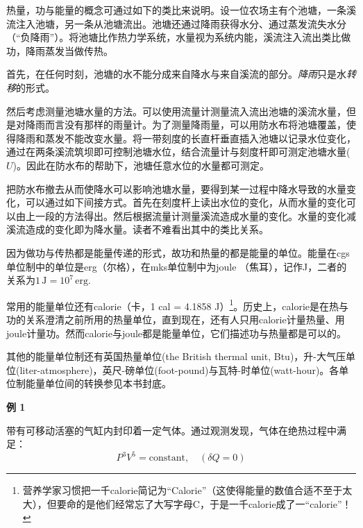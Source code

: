 热量，功与能量的概念可通过如下的类比来说明。设一位农场主有个池塘，一条溪流注入池塘，另一条从池塘流出。池塘还通过降雨获得水分、通过蒸发流失水分（“负降雨”）。将池塘比作热力学系统，水量视为系统内能，溪流注入流出类比做功，降雨蒸发当做传热。

首先，在任何时刻，池塘的水不能分成来自降水与来自溪流的部分。{\it 降雨}只是水{\it 转移}的形式。

然后考虑测量池塘水量的方法。可以使用流量计测量流入流出池塘的溪流水量，但是对降雨而言没有那样的雨量计。为了测量降雨量，可以用防水布将池塘覆盖，使得降雨和蒸发不能改变水量。将一带刻度的长直杆垂直插入池塘以记录水位变化，通过在两条溪流筑坝即可控制池塘水位，结合流量计与刻度杆即可测定池塘水量($U$)。因此在防水布的帮助下，池塘任意水位的水量都可测定。

把防水布撤去从而使降水可以影响池塘水量，要得到某一过程中降水导致的水量变化，可以通过如下间接方式。首先在刻度杆上读出水位的变化，从而水量的变化可以由上一段的方法得出。然后根据流量计测量溪流造成水量的变化。水量的变化减溪流造成的变化即为降水量。读者不难看出其中的类比关系。

因为做功与传热都是能量传递的形式，故功和热量的都是能量的单位。能量在cgs单位制中的单位是erg（尔格），在mks单位制中为joule （焦耳），记作J，二者的关系为$1\, \mathrm{J} = 10^7\, \mathrm{erg}.$

常用的能量单位还有calorie（卡，1 cal = 4.1858 J）\footnote{营养学家习惯把一千calorie简记为``Calorie''（这使得能量的数值合适不至于太大），但要命的是他们经常忘了大写字母C，于是一千calorie成了一``calorie''！}。历史上，calorie是在热与功的关系澄清之前所用的热量单位，直到现在，还有人只用calorie计量热量、用joule计量功。然而calorie与joule都是能量单位，它们描述功与热量都是可以的。

其他的能量单位制还有英国热量单位(the British thermal unit, Btu)，升-大气压单位(liter-atmosphere)，英尺-磅单位(foot-pound)与瓦特-时单位(watt-hour)。各单位制能量单位间的转换参见本书封底。

{\bf {\large 例 1}}
\ 

带有可移动活塞的气缸内封印着一定气体。通过观测发现，气体在绝热过程中满足：
\[
	P^3 V^5 = \text{constant}, \quad (\delta Q = 0)
\]

